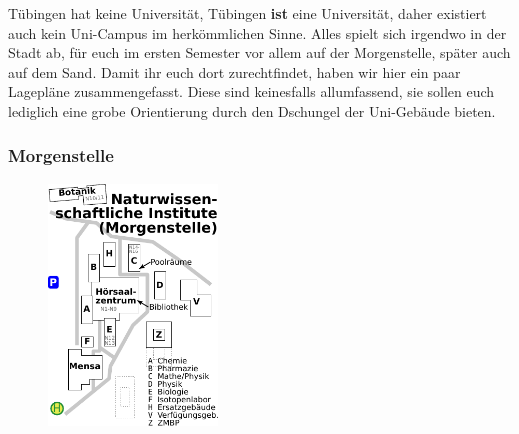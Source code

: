 Tübingen hat keine Universität, Tübingen \textbf{ist} eine Universität, daher existiert auch kein Uni-Campus im herkömmlichen Sinne. Alles spielt sich irgendwo in der Stadt ab, für euch im ersten Semester vor allem auf der Morgenstelle, später auch auf dem Sand. Damit ihr euch dort zurechtfindet, haben wir hier ein paar Lagepläne zusammengefasst. Diese sind keinesfalls allumfassend, sie sollen euch lediglich eine grobe Orientierung durch den Dschungel der Uni-Gebäude bieten.
\subsubsection*{Morgenstelle}
\begin{figure}[ht!]
\centering
\includegraphics[width=0.4\textwidth]{shared/anhang/lageplaene/uebersicht_morgenstelle.pdf}
\end{figure}

